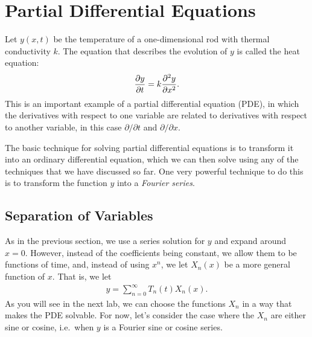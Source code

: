 \documentclass{book}
\begin{document}
\begin{enumerate}
\end{enumerate}



\chapter{Partial Differential Equations}
Let $y(x,t)$ be the temperature of a one-dimensional rod with thermal
conductivity $k$. The equation that describes the evolution of $y$ is
called the heat equation:
\begin{align*}
\frac{\partial y}{\partial t} =  k\frac{\partial^2 y}{\partial x^2}.
\end{align*}
This is an important example of a partial differential equation (PDE), in which
the derivatives with respect to one variable are related to derivatives with
respect to another variable, in this case $\partial/\partial t$ and
$\partial/\partial x$.

The basic technique for solving partial differential equations is to transform
it into an ordinary differential equation, which we can then solve using any
of the techniques that we have discussed so far. One very powerful technique
to do this is to transform the function $y$ into a \emph{Fourier series}.

\section{Separation of Variables}
As in the previous section, we use a series solution for $y$ and expand around
 $x=0$. However, instead of the coefficients being constant, we allow them to
be functions of time, and, instead of using $x^n$, we let $X_n(x)$ be a more
general function of $x$. That is, we let
\begin{align}
\boxed{y = \sum_{n=0}^\infty T_n(t) X_n(x)}.
\end{align}
As you will see in the next lab, we can choose the functions $X_n$ in a way
that makes the PDE solvable. For now, let's consider the case where the $X_n$
are either sine or cosine, i.e.\ when $y$ is a Fourier sine or cosine series.
\end{document}
